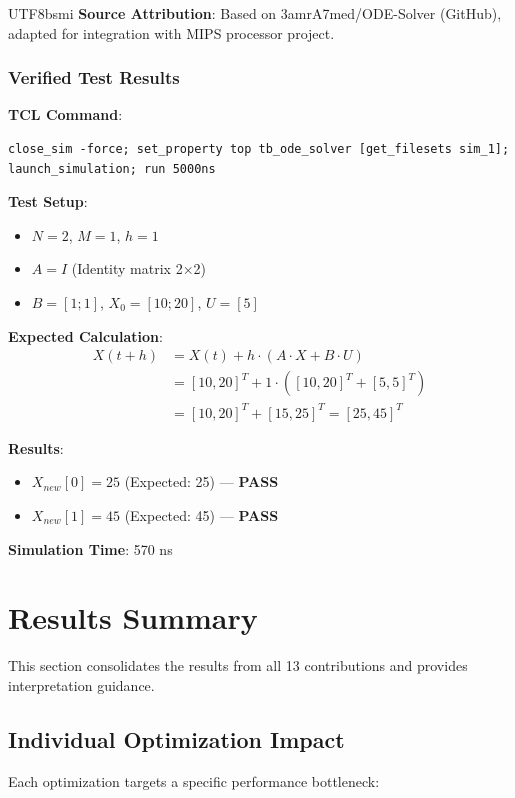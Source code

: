 \documentclass[journal,twoside]{IEEEtran}
\begin{document}
\begin{CJK}{UTF8}{bsmi}
\textbf{Source Attribution}: Based on 3amrA7med/ODE-Solver (GitHub), adapted for integration with MIPS processor project.

\subsubsection{Verified Test Results}
\textbf{TCL Command}:
\begin{lstlisting}
close_sim -force; set_property top tb_ode_solver [get_filesets sim_1]; launch_simulation; run 5000ns
\end{lstlisting}

\textbf{Test Setup}:
\begin{itemize}
    \item $N = 2$, $M = 1$, $h = 1$
    \item $A = I$ (Identity matrix 2$\times$2)
    \item $B = [1; 1]$, $X_0 = [10; 20]$, $U = [5]$
\end{itemize}

\textbf{Expected Calculation}:
\begin{align*}
X(t+h) &= X(t) + h \cdot (A \cdot X + B \cdot U) \\
       &= [10, 20]^T + 1 \cdot ([10, 20]^T + [5, 5]^T) \\
       &= [10, 20]^T + [15, 25]^T = [25, 45]^T
\end{align*}

\textbf{Results}:
\begin{itemize}
    \item $X_{new}[0] = 25$ (Expected: 25) --- \textbf{PASS}
    \item $X_{new}[1] = 45$ (Expected: 45) --- \textbf{PASS}
\end{itemize}

\textbf{Simulation Time}: 570 ns

\section{Results Summary}

This section consolidates the results from all 13 contributions and provides interpretation guidance.

\subsection{Individual Optimization Impact}
Each optimization targets a specific performance bottleneck:


\end{CJK}
\end{document}

